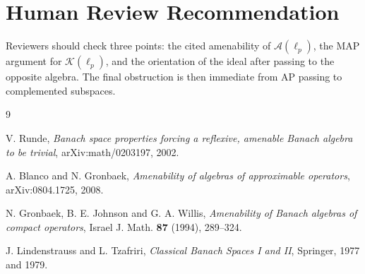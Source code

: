 \documentclass[11pt]{article}
\newcommand{\A}{\mathcal A}
\newcommand{\K}{\mathcal K}
\begin{document}
\section*{Human Review Recommendation}

Reviewers should check three points: the cited amenability of \(\A(\ell_p)\),
the MAP argument for \(\K(\ell_p)\), and the orientation of the ideal after
passing to the opposite algebra. The final obstruction is then immediate from
AP passing to complemented subspaces.

\begin{thebibliography}{9}

V. Runde,
\emph{Banach space properties forcing a reflexive, amenable Banach algebra to be trivial},
arXiv:math/0203197, 2002.

A. Blanco and N. Gronbaek,
\emph{Amenability of algebras of approximable operators},
arXiv:0804.1725, 2008.

N. Gronbaek, B. E. Johnson and G. A. Willis,
\emph{Amenability of Banach algebras of compact operators},
Israel J. Math. \textbf{87} (1994), 289--324.

J. Lindenstrauss and L. Tzafriri,
\emph{Classical Banach Spaces I and II},
Springer, 1977 and 1979.

\end{thebibliography}
\end{document}

